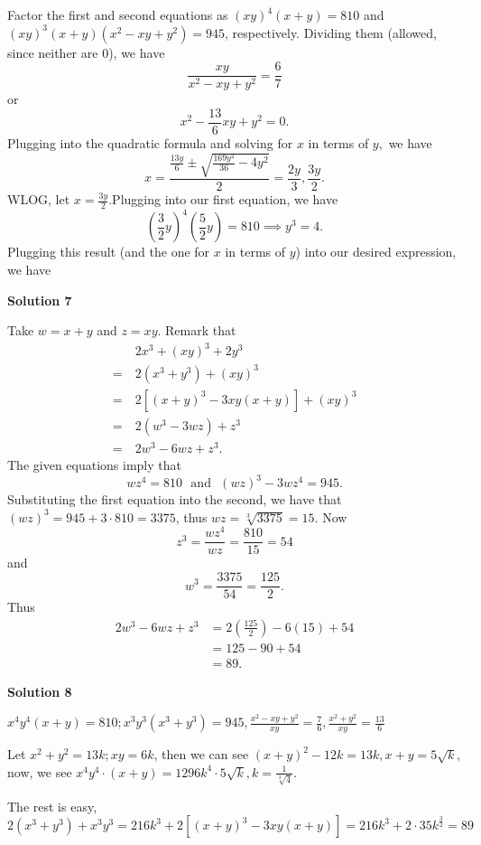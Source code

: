 \begin{enumerate}
Factor the first and second equations as $(xy)^4(x+y)=810$ and $(xy)^3(x+y)(x^2-xy+y^2)=945$, respectively. Dividing them (allowed, since neither are $0$), we have
 \[\frac{xy}{x^2-xy+y^2}=\frac67\]or
 \[x^2-\frac{13}{6}xy+y^2=0.\]Plugging into the quadratic formula and solving for $x$ in terms of $y,$ we have
 \[x=\frac{\frac{13y}{6}\pm \sqrt{\frac{169y^2}{36}-4y^2}}{2}=\frac{2y}3 , \frac{3y}2 .\]WLOG, let $x=\frac{3y}2 .$Plugging into our first equation, we have
 \[\left(\frac{3}{2}y\right)^4\left(\frac52 y\right)=810 \implies y^3 = 4 .\]Plugging this result (and the one for $x$ in terms of $y$) into our desired expression, we have

 



\textbf{Solution 7}

Take $w=x+y$ and $z=xy$. Remark that 
 \begin{align*} ~&2x^{3}+(xy)^{3}+2y^{3} \\ =~&2(x^{3}+y^{3})+(xy)^{3} \\ =~&2\left[(x+y)^{3}-3xy(x+y)\right]+(xy)^{3} \\ =~&2(w^{3}-3wz)+z^{3} \\ =~& 2w^{3}-6wz+z^{3}.\end{align*}
 The given equations imply that 
 \[wz^{4}=810~~~\text{and}~~~(wz)^{3}-3wz^{4}=945.\] Substituting the first equation into the second, we have that $(wz)^{3}=945+3\cdot 810=3375$, thus $wz=\sqrt[3]{3375}=15$. Now 
 \[z^{3}=\frac{wz^{4}}{wz}=\frac{810}{15}=54\] and 
 \[w^{3}=\frac{3375}{54}=\frac{125}{2}.\] Thus 
 \begin{align*}2w^{3}-6wz+z^{3}&=2\left(\frac{125}{2}\right)-6(15)+54 \\ &=125-90+54 \\ &=\boxed{89}.\end{align*}





\textbf{Solution 8}

$x^4y^4(x+y)=810; x^3y^3(x^3+y^3)=945, \frac{x^2-xy+y^2}{xy}=\frac{7}{6}, \frac{x^2+y^2}{xy}=\frac{13}{6}$

 Let $x^2+y^2=13k; xy=6k$, then we can see $(x+y)^2-12k=13k, x+y=5\sqrt{k}$, now, we see $x^4y^4\cdot (x+y)=1296k^4\cdot 5\sqrt{k}, k=\frac{1}{\sqrt[3]{4}}$.

 The rest is easy, $2(x^3+y^3)+x^3y^3=216k^3+2[(x+y)^3-3xy(x+y)]=216k^3+2\cdot 35k^{\frac{3}{2}}=\boxed{89}$





\end{enumerate}
